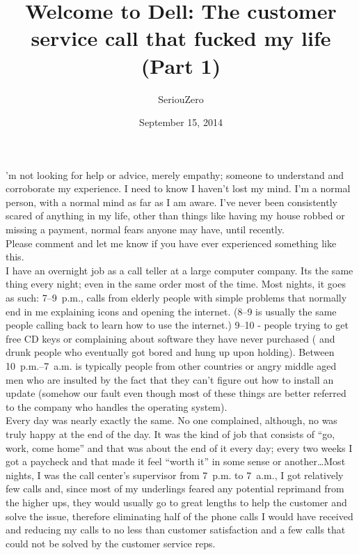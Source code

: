 \documentclass[a5paper]{scrartcl}
\title{Welcome to Dell: The customer service call that fucked my life (Part 1)}
\author{SeriouZero}
\date{September 15, 2014}
\begin{document}
\maketitle

'm not looking for help or advice, merely empathy; someone to understand and corroborate my experience. I need to know I haven't lost my mind. I'm a normal person, with a normal mind as far as I am aware. I've never been consistently scared of anything in my life, other than things like having my house robbed or missing a payment, normal fears anyone may have, until recently. \\


Please comment and let me know if you have ever experienced something like this.\\


I have an overnight job as a call teller at a large computer company. Its the same thing every night; even in the same order most of the time. Most nights, it goes as such: 7--9~p.m., calls from elderly people with simple problems that normally end in me explaining icons and opening the internet. (8--9 is usually the same people calling back to learn how to use the internet.) 9--10 - people trying to get free CD keys or complaining about software they have never purchased ( and drunk people who eventually got bored and hung up upon holding). Between 10~p.m.--7~a.m. is typically people from other countries or angry middle aged men who are insulted by the fact that they can't figure out how to install an update (somehow our fault even though most of these things are better referred to the company who handles the operating system). \\


Every day was nearly exactly the same. No one complained, although, no was truly happy at the end of the day. It was the kind of job that consists of \enquote{go, work, come home} and that was about the end of it every day; every two weeks I got a paycheck and that made it feel \enquote{worth it} in some sense or another\dots Most nights, I was the call center's supervisor from 7~p.m. to 7~a.m., I got relatively few calls and, since most of my underlings feared any potential reprimand from the higher ups, they would usually go to great lengths to help the customer and solve the issue, therefore eliminating half of the phone calls I would have received and reducing my calls to no less than customer satisfaction and a few calls that could not be solved by the customer service reps. \\
\end{document}
